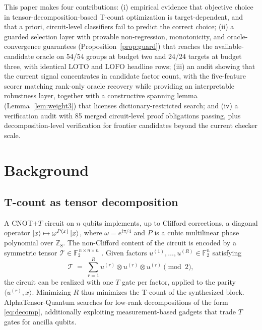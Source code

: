 \documentclass{cbctq}
\begin{document}
This paper makes four contributions:
(i) empirical evidence that objective choice in tensor-decomposition-based T-count optimization is target-dependent, and that a priori, circuit-level classifiers fail to predict the correct choice;
(ii) a guarded selection layer with provable non-regression, monotonicity, and oracle-convergence guarantees (Proposition~\ref{prop:guard}) that reaches the available-candidate oracle on 54/54 groups at budget two and 24/24 targets at budget three, with identical LOTO and LOFO headline rows;
(iii) an audit showing that the current signal concentrates in candidate factor count, with the five-feature scorer matching rank-only oracle recovery while providing an interpretable robustness layer, together with a constructive spanning lemma (Lemma~\ref{lem:weight3}) that licenses dictionary-restricted search; and
(iv) a verification audit with 85 merged circuit-level proof obligations passing, plus decomposition-level verification for frontier candidates beyond the current checker scale.

\section{Background}

\subsection{T-count as tensor decomposition}

A {CNOT}$+T$ circuit on $n$ qubits implements, up to Clifford corrections, a diagonal operator $\ket{x} \mapsto \omega^{P(x)}\ket{x}$, where $\omega = e^{i\pi/4}$ and $P$ is a cubic multilinear phase polynomial over $\mathbb{Z}_8$. The non-Clifford content of the circuit is encoded by a symmetric tensor $\mathcal{T}\in\mathbb{F}_2^{\,n\times n\times n}$ \cite{ruiz2025}. Given factors $u^{(1)},\dots,u^{(R)} \in \mathbb{F}_2^n$ satisfying
\begin{equation}
    \mathcal{T} \;=\; \sum_{r=1}^{R} u^{(r)} \otimes u^{(r)} \otimes u^{(r)} \pmod 2,
    \label{eq:decomp}
\end{equation}
the circuit can be realized with one $T$ gate per factor, applied to the parity $\langle u^{(r)}, x\rangle$. Minimizing $R$ thus minimizes the T-count of the synthesized block. AlphaTensor-Quantum searches for low-rank decompositions of the form \eqref{eq:decomp}, additionally exploiting measurement-based gadgets that trade $T$ gates for ancilla qubits.
\end{document}
